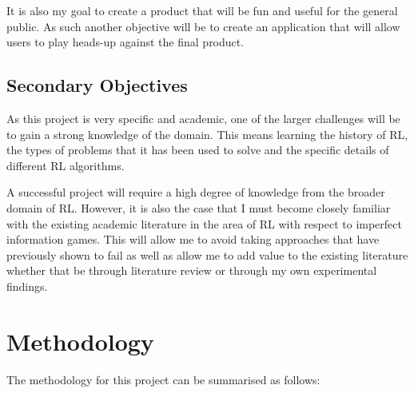 It is also my goal to create a product that will be fun and useful for the general public.
As such another objective will be to create an application that will allow users to play heads-up against the final product.

\subsection{Secondary Objectives}\label{subsec:secondaryObjectives}
As this project is very specific and academic, one of the larger challenges will be to gain a strong knowledge
of the domain.
This means learning the history of RL, the types of problems that it has been used to solve and the specific details of
different RL algorithms.

A successful project will require a high degree of knowledge from the broader domain of RL. However, it is also the case
that I must become closely familiar with the existing academic literature in the area of RL with respect to imperfect
information games.
This will allow me to avoid taking approaches that have previously shown to fail as well as allow me to add value to
the existing literature whether that be through literature review or through my own experimental findings.


\section{Methodology}\label{sec:methodology}

The methodology for this project can be summarised as follows:

